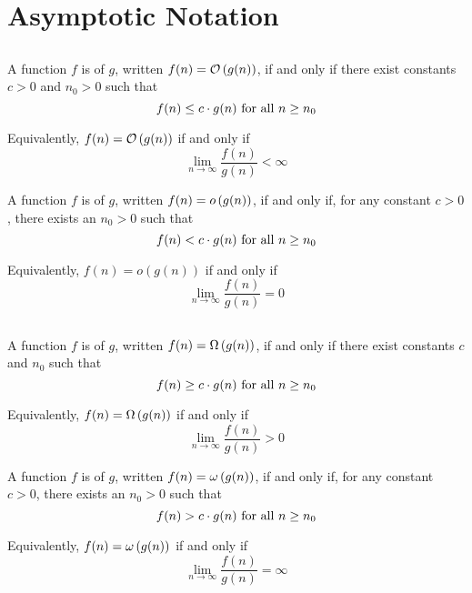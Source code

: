 
\section{Asymptotic Notation}
\subsection{\texorpdfstring{\bigOName}{Big-O}}
\begin{definition}{\bigOName}{}
    A function $f$ is \bigOName of $g$, written $f(n)=\mathcal{O}\left(g(n)\right)$, if and only if there exist constants $c>0$ and $n_0>0$ such that \[f(n)\leq c\cdot g(n)\hbox{ for all $n\geq n_0$}\]

    Equivalently, $f(n)=\mathcal{O}\left(g(n)\right)$ if and only if \[\lim_{n\to\infty}\frac{f(n)}{g(n)}<\infty\]
\end{definition}

\begin{definition}{\littleOName}
    A function $f$ is \littleOName of $g$, written $f(n)=o\left(g(n)\right)$, if and only if, for any constant $c>0$, there exists an $n_0>0$ such that \[f(n)< c\cdot g(n)\hbox{ for all $n\geq n_0$}\]

    Equivalently, $f(n)=o(g(n))$ if and only if \[\lim_{n\to\infty}\frac{f(n)}{g(n)}=0\]
\end{definition}

\subsection{\texorpdfstring{\bigOmName}{Big-Ω}}
\begin{definition}{\bigOmName}{}
    A function $f$ is \bigOmName of $g$, written $f(n)=\Omega\left(g(n)\right)$, if and only if there exist constants $c$ and $n_0$ such that \[f(n)\geq c\cdot g(n)\hbox{ for all $n\geq n_0$}\]

    Equivalently, $f(n)=\Omega\left(g(n)\right)$ if and only if \[\lim_{n\to\infty}\frac{f(n)}{g(n)}>0\]
\end{definition}

\begin{definition}{\littleOmName}{}
    A function $f$ is \littleOmName of $g$, written $f(n)=\omega\left(g(n)\right)$, if and only if, for any constant $c>0$, there exists an $n_0>0$ such that \[f(n)> c\cdot g(n)\hbox{ for all $n\geq n_0$}\]

    Equivalently, $f(n)=\omega\left(g(n)\right)$ if and only if \[\lim_{n\to\infty}\frac{f(n)}{g(n)}=\infty\]
\end{definition}


